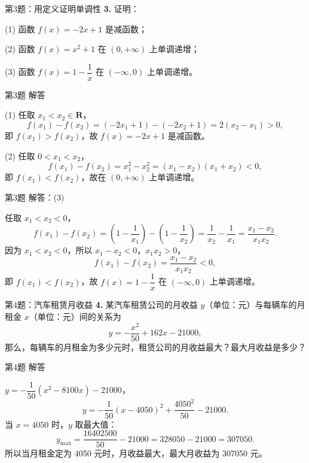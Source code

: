 \documentclass[10pt,aspectratio=169,serif,fleqn]{beamer}
\begin{document}
\begin{frame}[t]{第3题：用定义证明单调性}
\textbf{3.} 证明：

(1) 函数 $f(x)=-2x+1$ 是减函数；

(2) 函数 $f(x)=x^2+1$ 在 $(0,+\infty)$ 上单调递增；

(3) 函数 $f(x)=1-\dfrac{1}{x}$ 在 $(-\infty,0)$ 上单调递增。
\end{frame}

\begin{frame}[t]{第3题 解答}
\begin{tcolorbox}[colback=orange!10,colframe=orange,title=\textbf{解}]
(1) 任取 $x_1<x_2\in\mathbf{R}$，
\[
f(x_1)-f(x_2)=(-2x_1+1)-(-2x_2+1)=2(x_2-x_1)>0,
\]
即 $f(x_1)>f(x_2)$，故 $f(x)=-2x+1$ 是减函数。

\vspace{0.5em}
(2) 任取 $0<x_1<x_2$，
\[
f(x_1)-f(x_2)=x_1^2-x_2^2=(x_1-x_2)(x_1+x_2)<0,
\]
即 $f(x_1)<f(x_2)$，故在 $(0,+\infty)$ 上单调递增。
\end{tcolorbox}
\end{frame}

\begin{frame}[t]{第3题 解答：(3)}
\begin{tcolorbox}[colback=orange!10,colframe=orange,title=\textbf{解：(3)}]
任取 $x_1<x_2<0$，
\[
f(x_1)-f(x_2)=\left(1-\frac1{x_1}\right)-\left(1-\frac1{x_2}\right)=\frac1{x_2}-\frac1{x_1}=\frac{x_1-x_2}{x_1x_2}.
\]
因为 $x_1<x_2<0$，所以 $x_1-x_2<0$，$x_1x_2>0$，
\[
f(x_1)-f(x_2)=\frac{x_1-x_2}{x_1x_2}<0,
\]
即 $f(x_1)<f(x_2)$，故 $f(x)=1-\dfrac1x$ 在 $(-\infty,0)$ 上单调递增。
\end{tcolorbox}
\end{frame}

\begin{frame}[t]{第4题：汽车租赁月收益}
\textbf{4.} 某汽车租赁公司的月收益 $y$（单位：元）与每辆车的月租金 $x$（单位：元）间的关系为
\[
y=-\frac{x^2}{50}+162x-21000,
\]
那么，每辆车的月租金为多少元时，租赁公司的月收益最大？最大月收益是多少？
\end{frame}

\begin{frame}[t]{第4题 解答}
\begin{tcolorbox}[colback=orange!10,colframe=orange,title=\textbf{解}]
$y=-\dfrac1{50}(x^2-8100x)-21000$，
\[
y=-\frac1{50}(x-4050)^2+\frac{4050^2}{50}-21000.
\]
当 $x=4050$ 时，$y$ 取最大值：
\[
y_{\max}=\frac{16402500}{50}-21000=328050-21000=307050.
\]
\vspace{0.3em}
所以当月租金定为 \alert{4050 元}时，月收益最大，最大月收益为 \alert{307050 元}。
\end{tcolorbox}
\end{frame}
\end{document}
